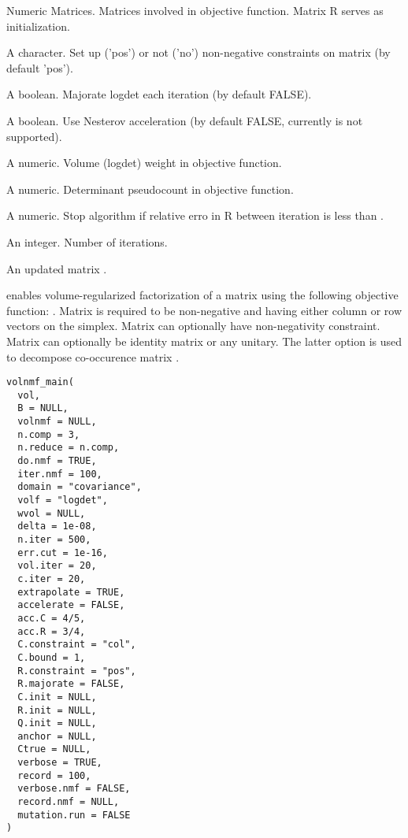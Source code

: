 \documentclass[letterpaper]{book}
\begin{document}
%
\begin{Arguments}
\begin{ldescription}
\item[\code{C, X, R}] Numeric Matrices. Matrices involved in objective function.
Matrix R serves as initialization.

\item[\code{R.constraint}] A character. Set up ('pos') or not ('no') non-negative constraints on matrix  (by default 'pos').

\item[\code{majorate}] A boolean. Majorate logdet each iteration (by default FALSE).

\item[\code{extrapolate}] A boolean. Use Nesterov acceleration (by default FALSE, currently is not supported).

\item[\code{w.vol}] A numeric. Volume (logdet) weight in objective function.

\item[\code{delta}] A numeric. Determinant pseudocount in objective function.

\item[\code{err.cut}] A numeric. Stop algorithm if relative erro in R between iteration is less than .

\item[\code{n.iter}] An integer. Number of iterations.
\end{ldescription}
\end{Arguments}
%
\begin{Value}
An updated matrix .
\end{Value}
%
\begin{Description}\relax
{} enables volume-regularized factorization of a matrix  using the following objective function:
. Matrix  is required to be non-negative and having either column or row vectors on the simplex.
Matrix  can optionally have non-negativity constraint. Matrix  can optionally be identity matrix or any unitary.
The latter option is used to decompose co-occurence matrix .
\end{Description}
%
\begin{Usage}
\begin{verbatim}
volnmf_main(
  vol,
  B = NULL,
  volnmf = NULL,
  n.comp = 3,
  n.reduce = n.comp,
  do.nmf = TRUE,
  iter.nmf = 100,
  domain = "covariance",
  volf = "logdet",
  wvol = NULL,
  delta = 1e-08,
  n.iter = 500,
  err.cut = 1e-16,
  vol.iter = 20,
  c.iter = 20,
  extrapolate = TRUE,
  accelerate = FALSE,
  acc.C = 4/5,
  acc.R = 3/4,
  C.constraint = "col",
  C.bound = 1,
  R.constraint = "pos",
  R.majorate = FALSE,
  C.init = NULL,
  R.init = NULL,
  Q.init = NULL,
  anchor = NULL,
  Ctrue = NULL,
  verbose = TRUE,
  record = 100,
  verbose.nmf = FALSE,
  record.nmf = NULL,
  mutation.run = FALSE
)
\end{verbatim}
\end{Usage}
\end{document}
